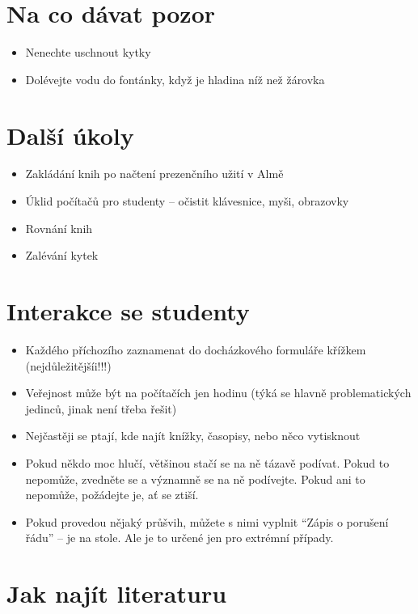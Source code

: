 \documentclass{article}
\begin{document}
\section{Na co dávat pozor}

\begin{itemize}
\item  Nenechte uschnout kytky
\item  Dolévejte vodu do fontánky, když je hladina níž než žárovka
\end{itemize}

\section{Další úkoly}

\begin{itemize}
\item Zakládání knih po načtení prezenčního užití v Almě
\item Úklid počítačů pro studenty -- očistit klávesnice, myši, obrazovky
\item Rovnání knih
\item  Zalévání kytek
\end{itemize}

\section{Interakce se studenty}

\begin{itemize}
\item Každého příchozího zaznamenat do docházkového formuláře křížkem (nejdůležitějšíi!!!)
\item Veřejnost může být na počítačích jen hodinu (týká se hlavně problematických jedinců, jinak není třeba řešit)
\item Nejčastěji se ptají, kde najít knížky, časopisy, nebo něco vytisknout
\item Pokud někdo moc hlučí, většinou stačí se na ně tázavě podívat. Pokud to nepomůže,
zvedněte se a významně se na ně podívejte. Pokud ani to nepomůže, požádejte je, ať se ztiší.
\item Pokud provedou nějaký průšvih, můžete s nimi vyplnit \enquote{Zápis o porušení řádu} -- je na stole. Ale je to určené jen pro extrémní případy. 
\end{itemize}
  

\section{Jak najít literaturu}
\end{document}
